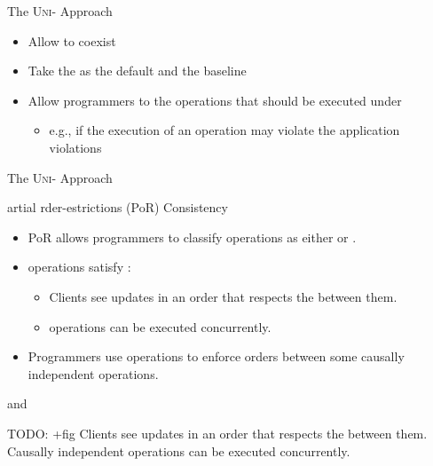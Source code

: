 \begin{frame}{The \textsc{Uni-} Approach}
  \begin{itemize}
    \setlength{\itemsep}{8pt}
    \item Allow  to coexist
    \item Take the  as the default and the baseline
    \item Allow programmers to  the operations that should be executed under 
      \begin{itemize}
        \item e.g., if the execution of an operation may violate the application violations
      \end{itemize}
  \end{itemize}
\end{frame}

\begin{frame}{The \textsc{Uni-} Approach}
  \begin{center}
    {artial rder-estrictions (PoR) Consistency} \\[3pt]
  \end{center}

  \begin{itemize}
    \setlength{\itemsep}{8pt}
    \item PoR allows programmers to classify operations as either  or .
    \pause
    \item {} operations satisfy \cc:
      \begin{itemize}
        \item Clients see updates in an order that respects the  between them. \\[3pt]
        \item {} operations can be executed concurrently.
      \end{itemize}
    \pause
    \item Programmers use  operations to enforce orders
      between some causally independent operations.
  \end{itemize}
\end{frame}

\begin{frame}{\ser{} and \cc}
  \begin{center}
    TODO: +fig
    Clients see updates in an order that respects the  between them. \\[3pt]
    Causally independent operations can be executed concurrently.
  \end{center}
\end{frame}

